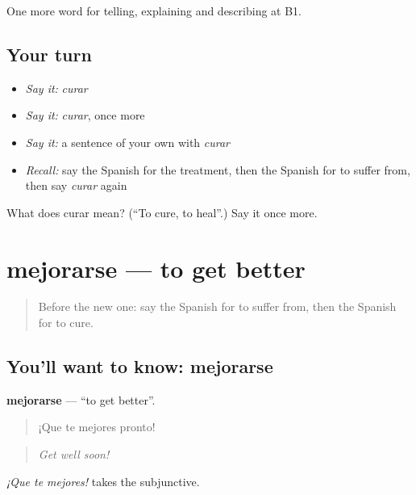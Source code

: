 \begin{grammarlens}[title={What you've built}]
One more word for telling, explaining and describing at B1.
\end{grammarlens}

\subsection*{Your turn}
\begin{itemize}
\raggedright
  \item \emph{Say it:} \emph{curar}
  \item \emph{Say it:} \emph{curar}, once more
  \item \emph{Say it:} a sentence of your own with \emph{curar}
  \item \emph{Recall:} say the Spanish for the treatment, then the Spanish for to suffer from, then say \emph{curar} again
\end{itemize}

\begin{tcolorbox}[breakable,colback=teal!4,colframe=teal!35!black,title={Before you move on}]
What does curar mean? (\textquotedblleft{}To cure, to heal\textquotedblright{}.) Say it once more.
\end{tcolorbox}
\section[mejorarse]{mejorarse — to get better}

\label{lesson:ES-C739-mejorarse}



\begin{quote}
Before the new one: say the Spanish for to suffer from, then the Spanish for to cure.
\end{quote}

\subsection*{You'll want to know: mejorarse}
\textbf{mejorarse} — \textquotedblleft{}to get better\textquotedblright{}.

\begin{quote}
¡Que te mejores pronto!
\end{quote}

\begin{quote}
\emph{Get well soon!}
\end{quote}

\emph{¡Que te mejores!} takes the subjunctive.

